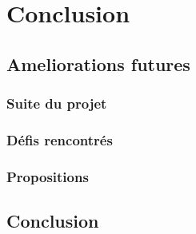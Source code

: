 \chapter{Conclusion}
        \section{Ameliorations futures}
        \subsection{Suite du projet}
        \lipsum[1]
         \subsection{Défis rencontrés}
        \lipsum[1]
         \subsection{Propositions}
        \lipsum[1]
        \section{Conclusion}
        \lipsum[1]